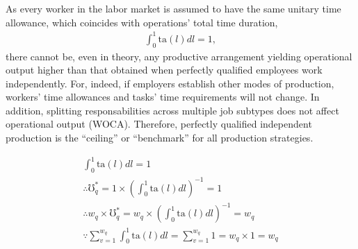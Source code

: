 \documentclass[hidelinks, nonatbib]{elsarticle}
\begin{document}
\begin{enumerate}
    As every worker in the labor market is assumed to have the same unitary time allowance, which coincides with operations' total time duration,
        \begin{gather}
            \int_{0}^{1}{
                \text{ta}(l)
                dl
            }
            =
            1
            ,
        \end{gather}
        there cannot be, even in theory, any productive arrangement yielding operational output higher than that obtained when perfectly qualified employees work independently. For, indeed, if employers establish other modes of production, workers' time allowances and tasks' time requirements will not change. In addition, splitting responsabilities across multiple job subtypes does not affect operational output (WOCA). Therefore, perfectly qualified independent production is the ``ceiling'' or ``benchmark'' for all production strategies.
        
        \begin{align}
            \int_{0}^{1}{
                \text{ta}(l)dl
            }
            =
            1
            \\
            \therefore
            \mho_{q}^{*}
            =
            1 \times \left(
                \int_{0}^{1}{
                    \text{ta}(l)dl
                }
            \right) ^ {-1}
            =
            1
            \\
            \therefore
            w_q \times
            \mho_{q}^{*}
            =
            w_q \times \left(
                \int_{0}^{1}{
                    \text{ta}(l)dl
                }
            \right) ^ {-1}
            =
            w_q
            \\
            \because
            \sum_{v=1}^{w_q}
            \int_{0}^{1}{
                    \text{ta}(l)dl
                }
            =
            \sum_{v=1}^{w_q}
            1
            = 
            w_q \times 1
            = 
            w_q
        \end{align}


\end{enumerate}
\end{document}
